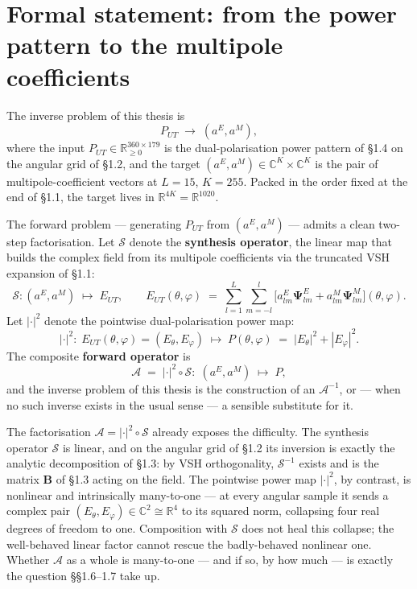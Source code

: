 \documentclass[11pt,a4paper]{report}
\begin{document}
\section{Formal statement: from the power pattern to the multipole coefficients}

The inverse problem of this thesis is
\[
P_{UT} \;\longrightarrow\; (a^E, a^M),
\]
where the input $P_{UT}\in\mathbb{R}_{\ge 0}^{360\times 179}$ is the
dual-polarisation power pattern of \S1.4 on the angular grid of \S1.2, and the target
$(a^E, a^M)\in\mathbb{C}^{K}\times\mathbb{C}^{K}$ is the pair of multipole-coefficient
vectors at $L=15$, $K=255$. Packed in the order fixed at the end of \S1.1, the
target lives in $\mathbb{R}^{4K}=\mathbb{R}^{1020}$.

The forward problem --- generating $P_{UT}$ from $(a^E, a^M)$ --- admits a clean
two-step factorisation. Let $\mathcal{S}$ denote the \textbf{synthesis operator}, the
linear map that builds the complex field from its multipole coefficients via the
truncated VSH expansion of \S1.1:
\[
\mathcal{S}: (a^E, a^M)\;\longmapsto\; E_{UT}, \qquad
E_{UT}(\theta,\varphi) \;=\; \sum_{l=1}^{L}\sum_{m=-l}^{l}\bigl[a^E_{lm}\boldsymbol{\Psi}^E_{lm} + a^M_{lm}\boldsymbol{\Psi}^M_{lm}\bigr](\theta,\varphi).
\]
Let $|\cdot|^2$ denote the pointwise dual-polarisation power map:
\[
|\cdot|^2: \;E_{UT}(\theta,\varphi) = (E_\theta, E_\varphi)\;\longmapsto\;P(\theta,\varphi) \;=\; |E_\theta|^2 + |E_\varphi|^2.
\]
The composite \textbf{forward operator} is
\[
\mathcal{A} \;=\; |\cdot|^2 \circ \mathcal{S}\colon \;(a^E, a^M)\;\longmapsto\;P,
\]
and the inverse problem of this thesis is the construction of an $\mathcal{A}^{-1}$,
or --- when no such inverse exists in the usual sense --- a sensible substitute for
it.

The factorisation $\mathcal{A} = |\cdot|^2 \circ \mathcal{S}$ already exposes the
difficulty. The synthesis operator $\mathcal{S}$ is linear, and on the angular grid
of \S1.2 its inversion is exactly the analytic decomposition of \S1.3: by VSH
orthogonality, $\mathcal{S}^{-1}$ exists and is the matrix $\mathbf B$ of \S1.3
acting on the field. The pointwise power map $|\cdot|^2$, by contrast, is nonlinear
and intrinsically many-to-one --- at every angular sample it sends a complex pair
$(E_\theta, E_\varphi)\in\mathbb{C}^2 \cong \mathbb R^4$ to its squared norm,
collapsing four real degrees of freedom to one. Composition with $\mathcal{S}$ does
not heal this collapse; the well-behaved linear factor cannot rescue the
badly-behaved nonlinear one. Whether $\mathcal{A}$ as a whole is many-to-one ---
and if so, by how much --- is exactly the question \S\S1.6--1.7 take up.
\end{document}
